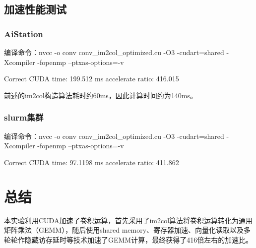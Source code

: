 \documentclass[UTF8,10pt]{ctexart}
\begin{document}
\subsection{加速性能测试}
\subsubsection{AiStation}
\begin{python}
编译命令：nvcc -o conv conv_im2col_optimized.cu -O3 -cudart=shared -Xcompiler -fopenmp --ptxas-options=-v
\end{python}
\begin{python}
Correct
CUDA time: 199.512 ms
accelerate ratio: 416.015
\end{python}
前述的im2col构造算法耗时约60ms，因此计算时间约为140ms。

\subsubsection{slurm集群}
\begin{python}
编译命令：nvcc -o conv conv_im2col_optimized.cu -O3 -cudart=shared -Xcompiler -fopenmp --ptxas-options=-v
\end{python}
\begin{python}
Correct
CUDA time: 97.1198 ms
accelerate ratio: 411.862
\end{python}

\section{总结}
本实验利用CUDA加速了卷积运算，首先采用了im2col算法将卷积运算转化为通用矩阵乘法（GEMM），随后使用shared memory、寄存器加速、向量化读取以及多轮轮作隐藏访存延时等技术加速了GEMM计算，最终获得了416倍左右的加速比。
\end{document}

